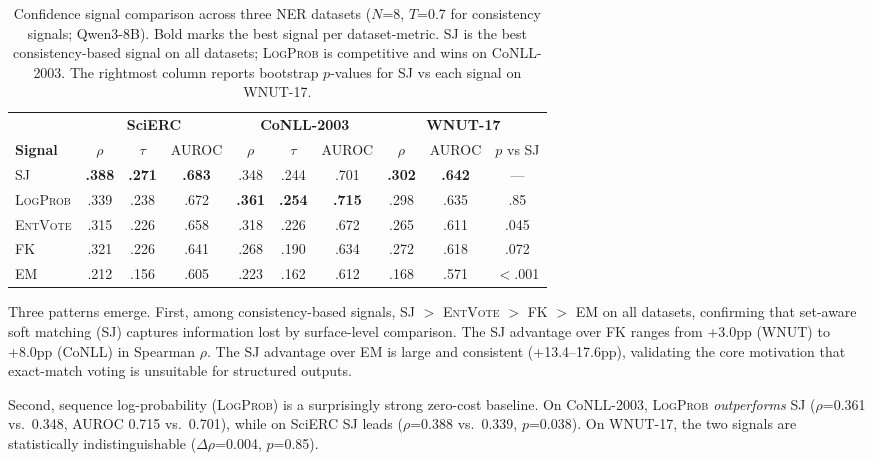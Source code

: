 \documentclass[11pt,a4paper]{article}
\newcommand{\SJ}{\textsc{SJ}}
\newcommand{\FK}{\textsc{FK}}
\newcommand{\LP}{\textsc{LogProb}}
\newcommand{\EM}{\textsc{EM}}
\newcommand{\EV}{\textsc{EntVote}}
\begin{document}
\begin{table}[t]
\centering
\small
\begin{tabular}{l ccc ccc ccc}
\toprule
& \multicolumn{3}{c}{\textbf{SciERC}} & \multicolumn{3}{c}{\textbf{CoNLL-2003}} & \multicolumn{3}{c}{\textbf{WNUT-17}} \\
\cmidrule(lr){2-4} \cmidrule(lr){5-7} \cmidrule(lr){8-10}
\textbf{Signal} & $\rho$ & $\tau$ & AUROC & $\rho$ & $\tau$ & AUROC & $\rho$ & AUROC & $p$ vs \SJ{} \\
\midrule
\SJ{} & \textbf{.388} & \textbf{.271} & \textbf{.683} & .348 & .244 & .701 & \textbf{.302} & \textbf{.642} & --- \\
\LP{} & .339 & .238 & .672 & \textbf{.361} & \textbf{.254} & \textbf{.715} & .298 & .635 & .85 \\
\EV{} & .315 & .226 & .658 & .318 & .226 & .672 & .265 & .611 & .045 \\
\FK{} & .321 & .226 & .641 & .268 & .190 & .634 & .272 & .618 & .072 \\
\EM{} & .212 & .156 & .605 & .223 & .162 & .612 & .168 & .571 & $<$.001 \\
\bottomrule
\end{tabular}
\caption{Confidence signal comparison across three NER datasets ($N$=8, $T$=0.7 for consistency signals; Qwen3-8B). Bold marks the best signal per dataset-metric. \SJ{} is the best consistency-based signal on all datasets; \LP{} is competitive and wins on CoNLL-2003. The rightmost column reports bootstrap $p$-values for \SJ{} vs each signal on WNUT-17.}
\label{tab:main-ner}
\end{table}

Three patterns emerge.
First, among consistency-based signals, \SJ{} $>$ \EV{} $>$ \FK{} $>$ \EM{} on all datasets, confirming that set-aware soft matching (\SJ{}) captures information lost by surface-level comparison.
The \SJ{} advantage over \FK{} ranges from +3.0pp (WNUT) to +8.0pp (CoNLL) in Spearman $\rho$.
The \SJ{} advantage over \EM{} is large and consistent (+13.4--17.6pp), validating the core motivation that exact-match voting is unsuitable for structured outputs.

Second, sequence log-probability (\LP{}) is a surprisingly strong zero-cost baseline.
On CoNLL-2003, \LP{} \emph{outperforms} \SJ{} ($\rho$=0.361 vs.\ 0.348, AUROC 0.715 vs.\ 0.701), while on SciERC \SJ{} leads ($\rho$=0.388 vs.\ 0.339, $p$=0.038).
On WNUT-17, the two signals are statistically indistinguishable ($\Delta\rho$=0.004, $p$=0.85).
\end{document}
